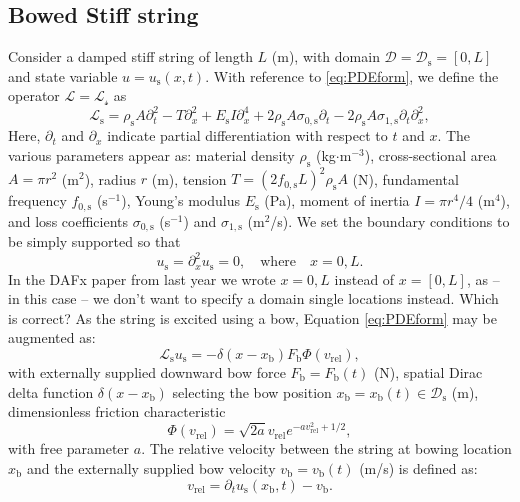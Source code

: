 \documentclass[dvipsnames, pdftex]{article}
\def\SBcomment[#1]{\textcolor{Red}{#1}}
\def\SWcomment[#1]{\textcolor{Bittersweet}{#1}}
\begin{document}
\subsection{Bowed Stiff string}
Consider a damped stiff string of length $L$ (m), with domain $\mathcal{D} = \mathcal{D}_\text{s} = [0,L]$ and state variable $u = u_\text{s}(x,t)$.  %
With reference to \eqref{eq:PDEform}, we define the operator $\mathcal{L} = \mathcal{L_\text{s}}$ as
\begin{equation}
    \mathcal{L}_\text{s} = \rho_\text{s} A \partial_t^2 - T\partial_x^2 + E_\text{s}I\partial_x^4+2\rho_\text{s} A\sigma_{0,\text{s}}\partial_t-2\rho_\text{s} A\sigma_{1,\text{s}}\partial_t\partial_x^2,
\end{equation}
Here, $\partial_{t}$ and $\partial_{x}$ indicate partial differentiation with respect to $t$ and $x$. The various parameters appear as: material density $\rho_\text{s}$ (kg$\cdot$m$^{-3}$), cross-sectional area $A = \pi r^2$ (m$^2$), radius $r$ (m), tension $T = (2f_{0,\text{s}}L)^2\rho_\text{s}A$ (N), fundamental frequency $f_{0,\text{s}}$ (s$^{-1}$), Young's modulus $E_\text{s}$ (Pa), moment of inertia $I=\pi r^4 / 4$ (m$^4$), and loss coefficients $\sigma_{0,\text{s}}$ (s$^{-1}$) and $\sigma_{1,\text{s}}$ (m$^2$/s). We set the boundary conditions to be simply supported so that
\begin{equation}\label{boundary}
    u_\text{s} = \partial_x^2u_\text{s} = 0, \quad \text{where} \quad x = 0, L.
\end{equation}
\SWcomment[In the DAFx paper from last year we wrote $x = 0, L$ instead of $x = {[}0, L{]}$, as -- in this case -- we don't want to specify a domain single locations instead. Which is correct?]
As the string is excited using a bow, Equation \eqref{eq:PDEform} may be augmented as:
\begin{equation}\label{eq:bowedString}
    \mathcal{L}_\text{s}u_\text{s} = -\delta(x-x_\text{b})F_\text{b}\Phi(v_\text{rel}),
\end{equation}
with externally supplied downward bow force $F_\text{b} = F_\text{b}(t)$ (N), spatial Dirac delta function $\delta(x-x_\text{b})$ selecting the bow position $x_\text{b} = x_\text{b}(t)\in \mathcal{D}_\text{s}$ (m), dimensionless friction characteristic
\begin{equation}
    \Phi(v_\text{rel}) = \sqrt{2a}v_\text{rel}e^{-av_\text{rel}^2+1/2},
\end{equation}
with free parameter $a$. The relative velocity between the string at bowing location $x_\text{b}$ and the externally supplied bow velocity $v_\text{b} = v_\text{b}(t)$ (m/s) is defined as:
\begin{equation}
    v_\text{rel} = \partial_tu_\text{s}(x_\text{b},t) - v_\text{b}.
\end{equation}
\end{document}

